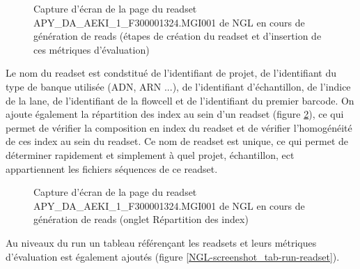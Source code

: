 \begin{figure}[H]
    \centering
    \caption{\footnotesize{Capture d'écran de la page du readset APY\_DA\_AEKI\_1\_F300001324.MGI001 de NGL en cours de génération de reads (étapes de création du readset et d'insertion de ces métriques d'évaluation)}}
    \label{NGL-screenshot_readset}
\end{figure}

Le nom du readset est condstitué de l'identifiant de projet, de l'identifiant du type de banque utilisée (ADN, ARN ...), de l'identifiant d'échantillon, de l'indice de la lane, de l'identifiant de la flowcell et de l'identifiant du premier barcode.
On ajoute également la répartition des index au sein d'un readset (figure \ref{NGL-screenshot_readset-index}), ce qui permet de vérifier la composition en index du readset et de vérifier l'homogénéité de ces index au sein du readset.
Ce nom de readset est unique, ce qui permet de déterminer rapidement et simplement à quel projet, échantillon, ect appartiennent les fichiers séquences de ce readset.

\begin{figure}[H]
    \centering
    \caption{\footnotesize{Capture d'écran de la page du readset APY\_DA\_AEKI\_1\_F300001324.MGI001 de NGL en cours de génération de reads (onglet \og Répartition des index\fg{})}}
    \label{NGL-screenshot_readset-index}
\end{figure}

Au niveaux du run un tableau référençant les readsets et leurs métriques d'évaluation est également ajoutés (figure \ref{NGL-screenshot_tab-run-readset}).

